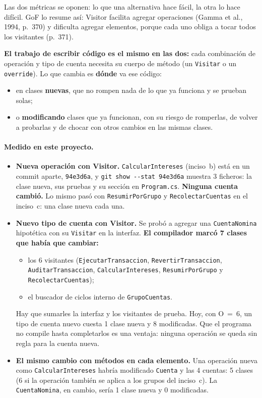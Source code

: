 Las dos métricas se oponen: lo que una alternativa hace fácil, la otra lo hace difícil. GoF lo
resume así: Visitor facilita agregar operaciones (Gamma et al., 1994, p.~370) y dificulta
agregar elementos, porque cada uno obliga a tocar todos los visitantes (p.~371).

\textbf{El trabajo de escribir código es el mismo en las dos:} cada combinación de operación y
tipo de cuenta necesita su cuerpo de método (un \texttt{Visitar} o un \texttt{override}). Lo
que cambia es \textbf{dónde} va ese código:
\begin{itemize}
  \item en clases \textbf{nuevas}, que no rompen nada de lo que ya funciona y se prueban
        solas;
  \item o \textbf{modificando} clases que ya funcionan, con su riesgo de romperlas, de volver
        a probarlas y de chocar con otros cambios en las mismas clases.
\end{itemize}

\paragraph{Medido en este proyecto.}
\begin{itemize}
  \item \textbf{Nueva operación con Visitor.} \texttt{CalcularIntereses} (inciso~b) está en un
        commit aparte, \texttt{94e3d6a}, y \texttt{git show -{}-stat 94e3d6a} muestra 3
        ficheros: la clase nueva, sus pruebas y su sección en \texttt{Program.cs}.
        \textbf{Ninguna cuenta cambió.} Lo mismo pasó con \texttt{ResumirPorGrupo} y
        \texttt{RecolectarCuentas} en el inciso~c: una clase nueva cada una.
  \item \textbf{Nuevo tipo de cuenta con Visitor.} Se probó a agregar una
        \texttt{CuentaNomina} hipotética con su \texttt{Visitar} en la interfaz. \textbf{El
        compilador marcó 7 clases que había que cambiar:}
        \begin{itemize}
          \item los 6 visitantes (\texttt{EjecutarTransaccion}, \texttt{RevertirTransaccion},
                \texttt{AuditarTransaccion}, \texttt{CalcularIntereses},
                \texttt{ResumirPorGrupo} y \texttt{RecolectarCuentas});
          \item el buscador de ciclos interno de \texttt{GrupoCuentas}.
        \end{itemize}
        Hay que sumarles la interfaz y los visitantes de prueba. Hoy, con O~=~6, un tipo de
        cuenta nuevo cuesta 1 clase nueva y 8 modificadas. Que el programa no compile hasta
        completarlos es una ventaja: ninguna operación se queda sin regla para la cuenta nueva.
  \item \textbf{El mismo cambio con métodos en cada elemento.} Una operación nueva como
        \texttt{CalcularIntereses} habría modificado \texttt{Cuenta} y las 4 cuentas: 5 clases
        (6 si la operación también se aplica a los grupos del inciso~c). La
        \texttt{CuentaNomina}, en cambio, sería 1 clase nueva y 0 modificadas.
\end{itemize}

